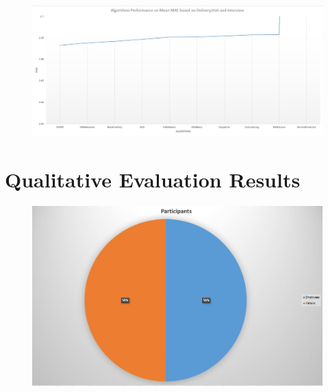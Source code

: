 \documentclass{aifyp}
\begin{document}
\begin{appendices}
\begin{figure}[H]
    \label{fig:AverageRMSEALL}
\end{figure}
\begin{figure}[H]
    \centering
    \includegraphics[scale=0.4]{Images/Chapter6/MeanMAE.JPG}
    \label{fig:AverageMAEALL}
\end{figure}

\newpage
\section{Qualitative Evaluation Results}
\begin{figure}[H]
    \centering
    \includegraphics[scale=0.4]{Images/Chapter6/UserEvaluation/Total/ParticipantsPiechar.JPG}
    \label{fig:figure1}
\end{figure}


\end{appendices}
\end{document}
